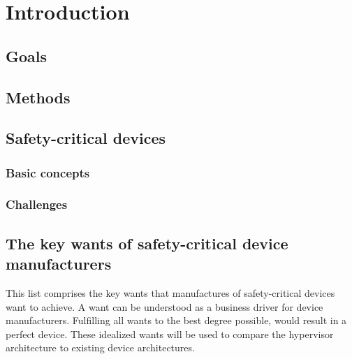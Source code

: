 
\chapter{Introduction} %

\label{Chapter1} %


\newcommand{\keyword}[1]{\textbf{#1}}
\newcommand{\tabhead}[1]{\textbf{#1}}
\newcommand{\code}[1]{\texttt{#1}}
\newcommand{\file}[1]{\texttt{\bfseries#1}}
\newcommand{\option}[1]{\texttt{\itshape#1}}


\section{Goals}



\section{Methods}



\section{Safety-critical devices}
\subsection{Basic concepts}
\subsection{Challenges}


\section{The key wants of safety-critical device manufacturers}
This list comprises the key wants that manufactures of safety-critical devices want to achieve. A want can be understood as a business driver for device manufacturers. Fulfilling all wants to the best degree possible, would result in a perfect device. These idealized wants will be used to compare the hypervisor architecture to existing device architectures.

